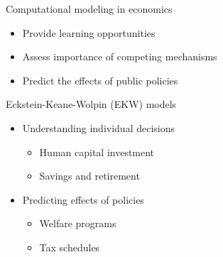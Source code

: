 \begin{frame}{Computational modeling in economics}

\begin{itemize}\setlength\itemsep{1em}
\item Provide learning opportunities
\item Assess importance of competing mechanisms
\item Predict the effects of public policies
\end{itemize}

\end{frame}
  \begin{frame}{Eckstein-Keane-Wolpin (EKW) models}

  \begin{itemize}\setlength\itemsep{1em}
  	\item Understanding individual decisions\medskip
  	\begin{itemize}\setlength\itemsep{1em}
  		\item Human capital investment
  		\item Savings and retirement
  	\end{itemize}
  	\item Predicting effects of policies\medskip
  	\begin{itemize}\setlength\itemsep{1em}
  		\item Welfare programs
  		\item Tax schedules
  	\end{itemize}

  \end{itemize}
  \end{frame}

